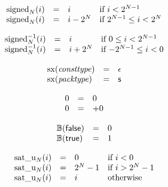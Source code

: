 \vspace{1ex}

\vspace{1ex}

\vspace{1ex}

\vspace{1ex}

$$
\begin{array}[t]{@{}lcl@{}l@{}}
{{\mathrm{signed}}}_{N}(i) & = & i & \quad \mbox{if}~ i < {2^{N - 1}} \\
{{\mathrm{signed}}}_{N}(i) & = & i - {2^{N}} & \quad \mbox{if}~ {2^{N - 1}} \leq i < {2^{N}} \\
\end{array}
$$

$$
\begin{array}[t]{@{}lcl@{}l@{}}
{{{{\mathrm{signed}}}_{N}^{{-1}}}}{(i)} & = & i & \quad \mbox{if}~ 0 \leq i < {2^{N - 1}} \\
{{{{\mathrm{signed}}}_{N}^{{-1}}}}{(i)} & = & i + {2^{N}} & \quad \mbox{if}~ {-{2^{N - 1}}} \leq i < 0 \\
\end{array}
$$

\vspace{1ex}

$$
\begin{array}[t]{@{}lcl@{}l@{}}
{\mathrm{sx}}({\mathit{consttype}}) & = & \epsilon \\
{\mathrm{sx}}({\mathit{packtype}}) & = & \mathsf{s} \\
\end{array}
$$

\vspace{1ex}

$$
\begin{array}[t]{@{}lcl@{}l@{}}
0 & = & 0 \\
0 & = & {+0} \\
\end{array}
$$

$$
\begin{array}[t]{@{}lcl@{}l@{}}
\mathbb{B}(\mathsf{false}) & = & 0 \\
\mathbb{B}(\mathsf{true}) & = & 1 \\
\end{array}
$$

\vspace{1ex}

$$
\begin{array}[t]{@{}lcl@{}l@{}}
{{\mathrm{sat\_u}}}_{N}(i) & = & 0 & \quad \mbox{if}~ i < 0 \\
{{\mathrm{sat\_u}}}_{N}(i) & = & {2^{N}} - 1 & \quad \mbox{if}~ i > {2^{N}} - 1 \\
{{\mathrm{sat\_u}}}_{N}(i) & = & i & \quad \mbox{otherwise} \\
\end{array}
$$

